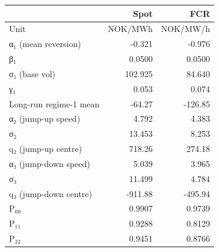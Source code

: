 \begin{tabular}{lrr}
\toprule
 & Spot & FCR \\
\midrule
Unit & NOK/MWh & NOK/MW/h \\
α₁ (mean reversion) & -0.321 & -0.976 \\
β₁ & 0.0500 & 0.0500 \\
σ₁ (base vol) & 102.925 & 84.640 \\
γ₁ & 0.053 & 0.074 \\
Long-run regime-1 mean & -64.27 & -126.85 \\
α₂ (jump-up speed) & 4.792 & 4.383 \\
σ₂ & 13.453 & 8.253 \\
q₂ (jump-up centre) & 718.26 & 274.18 \\
α₃ (jump-down speed) & 5.039 & 3.965 \\
σ₃ & 11.499 & 4.784 \\
q₃ (jump-down centre) & -911.88 & -495.94 \\
P₀₀ & 0.9907 & 0.9739 \\
P₁₁ & 0.9288 & 0.8129 \\
P₂₂ & 0.9451 & 0.8766 \\
\bottomrule
\end{tabular}
